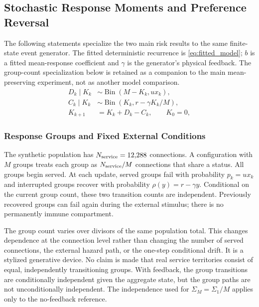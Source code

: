 \subsection{Stochastic Response Moments and Preference Reversal}
\label{app:nls}
The following statements specialize the two main risk results to the same finite-state event generator. The fitted deterministic recurrence is \eqref{eq:fitted_model}; $b$ is a fitted mean-response coefficient and $\gamma$ is the generator's physical feedback. The group-count specialization below is retained as a companion to the main mean-preserving experiment, not as another model comparison.
\label{app:kernel}\label{app:process}
\begin{equation}
 \begin{aligned}
 D_k\mid K_k&\sim\operatorname{Bin}(M-K_k,ux_k),\\
 C_k\mid K_k&\sim\operatorname{Bin}(K_k,r-\gamma K_k/M),\\
 K_{k+1}&=K_k+D_k-C_k,\qquad K_0=0,
 \end{aligned}
 \label{eq:process}
\end{equation}

\subsubsection{Response Groups and Fixed External Conditions}
The synthetic population has $N_{\rm service}=12{,}288$ connections. A configuration with $M$ groups treats each group as $N_{\rm service}/M$ connections that share a status. All groups begin served. At each update, served groups fail with probability $p_k=ux_k$ and interrupted groups recover with probability $\rho(y)=r-\gamma y$. Conditional on the current group count, these two transition counts are independent. Previously recovered groups can fail again during the external stimulus; there is no permanently immune compartment.

The group count varies over divisors of the same population total. This changes dependence at the connection level rather than changing the number of served connections, the external hazard path, or the one-step conditional drift. It is a stylized generative device. No claim is made that real service territories consist of equal, independently transitioning groups. With feedback, the group transitions are conditionally independent given the aggregate state, but the group paths are not unconditionally independent. The independence used for $\Sigma_M=\Sigma_1/M$ applies only to the no-feedback reference.

